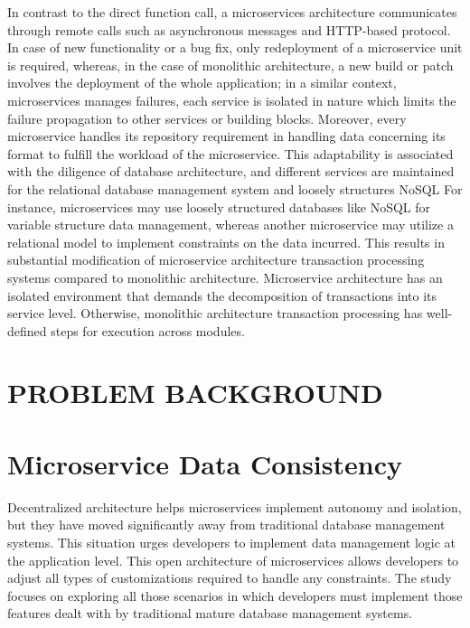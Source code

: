 \documentclass[a4paper,12pt]{article}
\begin{document}
In contrast to the direct function call, a microservices architecture communicates through remote calls such as asynchronous messages and HTTP-based protocol. \cite{cite-31} In case of new functionality or a bug fix, only redeployment of a microservice unit is required, whereas, in the case of monolithic architecture, a new build or patch involves the deployment of the whole application; in a similar context, microservices manages failures, each service is isolated in nature which limits the failure propagation to other services or building blocks. Moreover, every microservice handles its repository requirement in handling data concerning its format to fulfill the workload of the microservice. \cite{thirteen, fifteen} This adaptability is associated with the diligence of database architecture, and different services are maintained for the relational database management system and loosely structures NoSQL
For instance, microservices may use loosely structured databases like NoSQL for variable structure data management, whereas another microservice may utilize a relational model to implement constraints on the data incurred. This results in substantial modification of microservice architecture transaction processing systems compared to monolithic architecture. \cite{cite-32} Microservice architecture has an isolated environment that demands the decomposition of transactions into its service level. Otherwise, monolithic architecture transaction processing has well-defined steps for execution across modules.\cite{four, nine, ten}


\section*{PROBLEM BACKGROUND}
%

\section{Microservice Data Consistency}
 
Decentralized architecture helps microservices implement autonomy and isolation, but they have moved significantly away from traditional database management systems. \cite{three, four} This situation urges developers to implement data management logic at the application level. This open architecture of microservices allows developers to adjust all types of customizations required to handle any constraints. \cite{cite-33} The study focuses on exploring all those scenarios in which developers must implement those features dealt with by traditional mature database management systems.
\end{document}
